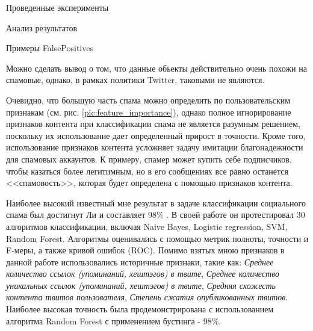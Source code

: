 \begin{section}{Проведенные эксперименты}
\begin{subsection}{Анализ результатов}
\begin{table}[H]
\caption{Примеры FalsePositives}
\label{tab:fp2}
\end{table}


Можно сделать вывод о том, что данные обьекты действительно очень похожи на спамовые, однако, в рамках политики Twitter, таковыми не являются.

Очевидно, что большую часть спама можно определить по пользовательским признакам (см. рис. \ref{pic:feature_importance}), однако полное игнорирование признаков контента при классификации спама не является разумным решением, поскольку их использование дает определенный прирост в точности. Кроме того, использование признаков контента усложняет задачу имитации благонадежности для спамовых аккаунтов. К примеру, спамер может купить себе подписчиков, чтобы казаться более легитимным, но в его сообщениях все равно останется <<спамовость>>, которая будет определена с помощью признаков контента.

Наиболее высокий известный мне результат в задаче классификации социального спама был достигнут Ли \cite{Lee} и составляет $98$\% . В своей работе он протестировал 30 алгоритмов классификации, включая Naive Bayes, Logistic regression, SVM, Random Forest. Алгоритмы оценивались с помощью метрик полноты, точности и F-меры, а также кривой ошибок (ROC).  Помимо взятых мною признаков в данной работе использовались историчные признаки, такие как: \textit{Среднее количество ссылок (упоминаний, хештэгов) в твите},  \textit{Среднее количество  уникальных ссылок (упоминаний, хештэгов) в твите}, \textit{Средняя схожесть контента твитов пользователя}, \textit{Степень сжатия опубликованных твитов}. Наиболее высокая точность была продемонстрирована с использованием алгоритма Random Forest с применением бустинга - $98$\%.


\end{subsection}









\end{section}
